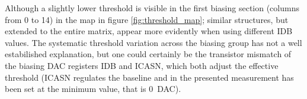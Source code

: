         Although a slightly lower threshold is visible in the first biasing section (columns from 0 to 14) in the map in figure \ref{fig:threshold_map}; similar structures, but extended to the entire matrix, appear more evidently when using different IDB values. 
        The systematic threshold variation across the biasing group has not a well estabilished explanation, but one could certainly be the transistor mismatch of the biasing DAC registers IDB and ICASN, which both adjust the effective threshold (ICASN regulates the baseline and in the presented measurement has been set at the minimum value, that is \SI{0}{DAC}).

